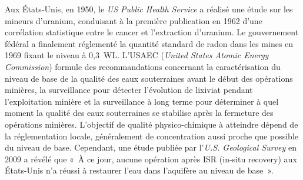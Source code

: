 \documentclass{article}
\begin{document}
Aux États-Unis, en 1950, le \textit{US Public Health Service} a réalisé une étude sur les mineurs d'uranium, conduisant à la première publication en 1962 d'une corrélation statistique entre le cancer et l'extraction d'uranium. Le gouvernement fédéral a finalement réglementé la quantité standard de radon dans les mines en 1969 fixant le niveau à 0,3~WL.
L'USAEC (\textit{United States Atomic Energy Commission}) formule des recommandations concernant la caractérisation du niveau de base de la qualité des eaux souterraines avant le début des opérations minières, la surveillance pour détecter l’évolution de lixiviat pendant l'exploitation minière et la surveillance à long terme pour déterminer à quel moment la qualité des eaux souterraines se stabilise après la fermeture des opérations minières.
L'objectif de qualité physico-chimique à atteindre dépend de la réglementation locale, généralement de concentration aussi proche que possible du niveau de base.
Cependant, une étude publiée par l'\textit{U.S. Geological Survey} en 2009 a révélé que «~À ce jour, aucune opération après ISR (in-situ recovery) aux États-Unis n'a réussi à restaurer l'eau dans l'aquifère au niveau de base~».
\end{document}
